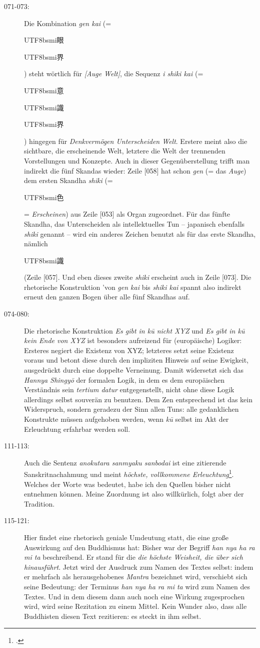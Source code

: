 \documentclass[
DIV=calc,
BCOR=5mm,
11pt,
headings=small,
oneside,
bibtotocnumbered,
english,ngerman]{scrartcl}
\newcommand{\cnbsmi}[1]{\begin{CJK}{UTF8}{bsmi}#1\end{CJK}}
\begin{document}
\begin{description}
  \item[071-073:] Die Kombination \emph{gen kai} (= \cnbsmi{眼} \cnbsmi{界}) steht
  wörtlich für \emph{[Auge Welt]}, die Sequenz \emph{i shiki kai} (= \cnbsmi{意}
  \cnbsmi{識} \cnbsmi{界}) hingegen für \emph{Denkvermögen Unterscheiden Welt}.
  Erstere meint also die sichtbare, die erscheinende Welt, letztere die Welt der
  trennenden Vorstellungen und Konzepte. Auch in dieser Gegenüberstellung trifft
  man indirekt die fünf Skandas wieder: Zeile [058] hat schon \emph{gen} (= das
  \emph{Auge}) dem ersten Skandha \emph{shiki} (= \cnbsmi{色} =
  \emph{Erscheinen}) aus Zeile [053] als Organ zugeordnet. Für das fünfte
  Skandha, das Unterscheiden als intellektuelles Tun -- japanisch ebenfalls
  \emph{shiki} genannt -- wird ein anderes Zeichen benutzt als für das erste
  Skandha, nämlich \cnbsmi{識} (Zeile [057]. Und eben dieses zweite \emph{shiki}
  erscheint auch in Zeile [073]. Die rhetorische Konstruktion 'von \emph{gen
  kai} bis \emph{shiki kai} spannt also indirekt erneut den ganzen Bogen über
  alle fünf Skandhas auf.

  \item[074-080:] Die rhetorische Konstruktion \emph{Es gibt in kū nicht XYZ}
  und \emph{Es gibt in kū kein Ende von XYZ} ist besonders aufreizend für
  (europäische) Logiker: Ersteres negiert die Existenz von XYZ; letzteres setzt
  seine Existenz voraus und betont diese durch den impliziten Hinweis auf seine
  Ewigkeit, ausgedrückt durch eine doppelte Verneinung. Damit widersetzt sich
  das \emph{Hannya Shingyō} der formalen Logik, in dem es dem europäischen
  Verständnis sein \emph{tertium datur} entgegenstellt, nicht ohne diese Logik
  allerdings selbst souverän zu benutzen. Dem Zen entsprechend ist das kein
  Widerspruch, sondern geradezu der Sinn allen Tuns: alle gedanklichen
  Konstrukte müssen aufgehoben werden, wenn \emph{kū} selbst im  Akt der
  Erleuchtung erfahrbar werden soll.

  \item[111-113:] Auch die Sentenz \emph{anokutara sanmyaku sanbodai} ist eine
  zitierende Sanskritnachahmung und meint \emph{höchste, vollkommene
  Erleuchtung}\footcite[vgl.][\nopage Anm. 10]{Scheid2016a}. Welches der Worte
  was bedeutet, habe ich den Quellen bisher nicht entnehmen können. Meine
  Zuordnung ist also willkürlich, folgt aber der Tradition.

  \item[115-121:] Hier findet eine rhetorisch geniale Umdeutung statt, die eine
  große Auswirkung auf den Buddhismus hat: Bisher war der Begriff \emph{han nya
  ha ra mi ta} beschreibend. Er stand für die \emph{die höchste Weisheit, die
  über sich hinausführt}. Jetzt wird der Ausdruck zum Namen des Textes selbst:
  indem er mehrfach als herausgehobenes \emph{Mantra} bezeichnet wird,
  verschiebt sich seine Bedeutung: der Terminus \emph{han nya ha ra mi ta} wird
  zum Namen des Textes. Und in dem diesem dann auch noch eine Wirkung
  zugesprochen wird, wird seine Rezitation zu einem Mittel. Kein Wunder also,
  dass alle Buddhisten diesen Text rezitieren: es steckt in ihm selbst.
 

\end{description}
\end{document}
